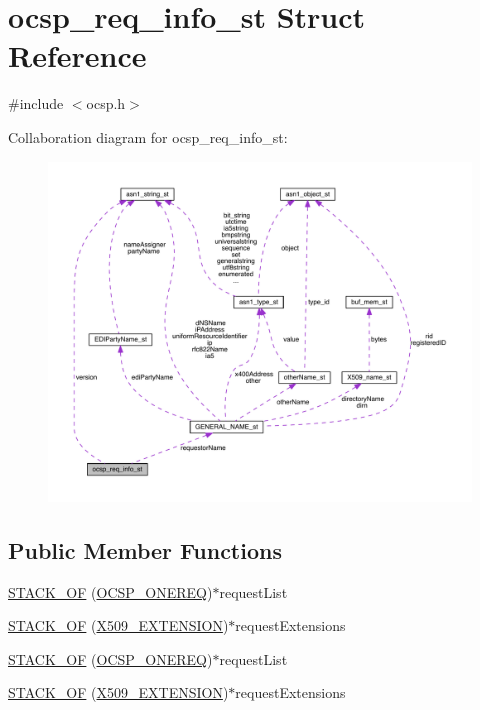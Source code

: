 \hypertarget{structocsp__req__info__st}{}\section{ocsp\+\_\+req\+\_\+info\+\_\+st Struct Reference}
\label{structocsp__req__info__st}


{\ttfamily \#include $<$ocsp.\+h$>$}



Collaboration diagram for ocsp\+\_\+req\+\_\+info\+\_\+st\+:\nopagebreak
\begin{figure}[H]
\begin{center}
\leavevmode
\includegraphics[width=350pt]{structocsp__req__info__st__coll__graph}
\end{center}
\end{figure}
\subsection*{Public Member Functions}
\begin{DoxyCompactItemize}
\item 
\hyperlink{structocsp__req__info__st_a489bd9a194ea52658c508621e1b8b34e}{S\+T\+A\+C\+K\+\_\+\+OF} (\hyperlink{crypto_2ocsp_2ocsp_8h_a43e15d6fbd17f20cf0b3095cd123d234}{O\+C\+S\+P\+\_\+\+O\+N\+E\+R\+EQ})$\ast$request\+List
\item 
\hyperlink{structocsp__req__info__st_a171f38dd4b64ff009fc2247f603b62d3}{S\+T\+A\+C\+K\+\_\+\+OF} (\hyperlink{crypto_2x509_2x509_8h_ab2f7f7dc0ced8684e0cbfc818e408304}{X509\+\_\+\+E\+X\+T\+E\+N\+S\+I\+ON})$\ast$request\+Extensions
\item 
\hyperlink{structocsp__req__info__st_a489bd9a194ea52658c508621e1b8b34e}{S\+T\+A\+C\+K\+\_\+\+OF} (\hyperlink{crypto_2ocsp_2ocsp_8h_a43e15d6fbd17f20cf0b3095cd123d234}{O\+C\+S\+P\+\_\+\+O\+N\+E\+R\+EQ})$\ast$request\+List
\item 
\hyperlink{structocsp__req__info__st_a171f38dd4b64ff009fc2247f603b62d3}{S\+T\+A\+C\+K\+\_\+\+OF} (\hyperlink{crypto_2x509_2x509_8h_ab2f7f7dc0ced8684e0cbfc818e408304}{X509\+\_\+\+E\+X\+T\+E\+N\+S\+I\+ON})$\ast$request\+Extensions
\end{DoxyCompactItemize}
